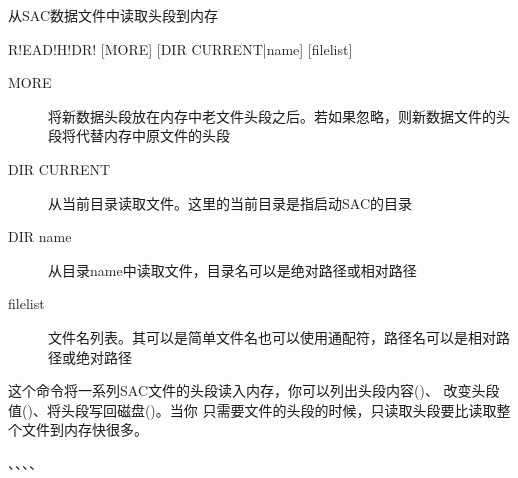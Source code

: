 \label{cmd:readhdr}

从SAC数据文件中读取头段到内存

\begin{SACSTX}
R!EAD!H!DR! [MORE] [DIR CURRENT|name] [filelist]
\end{SACSTX}

\begin{description}
\item [MORE] 将新数据头段放在内存中老文件头段之后。若如果忽略，则新数据文件的头段将代替内存中原文件的头段
\item [DIR CURRENT] 从当前目录读取文件。这里的当前目录是指启动SAC的目录
\item [DIR name] 从目录name中读取文件，目录名可以是绝对路径或相对路径
\item [filelist] 文件名列表。其可以是简单文件名也可以使用通配符，路径名可以是相对路径或绝对路径
\end{description}

这个命令将一系列SAC文件的头段读入内存，你可以列出头段内容()、
改变头段值()、将头段写回磁盘()。当你
只需要文件的头段的时候，只读取头段要比读取整个文件到内存快很多。

、、、、
